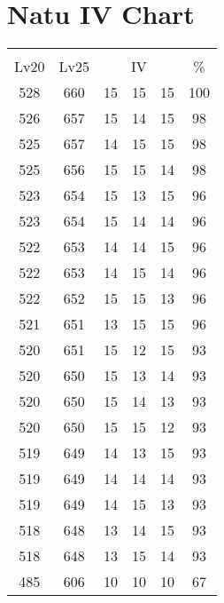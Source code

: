 \documentclass{article}%
\begin{document}
%
\normalsize%
\section{Natu IV Chart}%
\label{sec:Natu IV Chart}%
\renewcommand{\arraystretch}{1.5}%
\begin{tabular}{|c|c|c|c|c|c|}%
\hline%
\multicolumn{6}{|c|}{\textcolor{white}{ 
\linebreak{Natu}
}%
\cellcolor{black}}\\%
\multicolumn{1}{|c}{Lv20}&\multicolumn{1}{c|}{Lv25}&\multicolumn{3}{c|}{IV}&\multicolumn{1}{|c|}{\%}\\%
\hline%
\rowcolor{color100}%
528&660&15&15&15&100\\%
\hline%
\rowcolor{color98}%
526&657&15&14&15&98\\%
\hline%
\rowcolor{color98}%
525&657&14&15&15&98\\%
\hline%
\rowcolor{color98}%
525&656&15&15&14&98\\%
\hline%
\rowcolor{color96}%
523&654&15&13&15&96\\%
\hline%
\rowcolor{color96}%
523&654&15&14&14&96\\%
\hline%
\rowcolor{color96}%
522&653&14&14&15&96\\%
\hline%
\rowcolor{color96}%
522&653&14&15&14&96\\%
\hline%
\rowcolor{color96}%
522&652&15&15&13&96\\%
\hline%
\rowcolor{color96}%
521&651&13&15&15&96\\%
\hline%
\rowcolor{color93}%
520&651&15&12&15&93\\%
\hline%
\rowcolor{color93}%
520&650&15&13&14&93\\%
\hline%
\rowcolor{color93}%
520&650&15&14&13&93\\%
\hline%
\rowcolor{color93}%
520&650&15&15&12&93\\%
\hline%
\rowcolor{color93}%
519&649&14&13&15&93\\%
\hline%
\rowcolor{color93}%
519&649&14&14&14&93\\%
\hline%
\rowcolor{color93}%
519&649&14&15&13&93\\%
\hline%
\rowcolor{color93}%
518&648&13&14&15&93\\%
\hline%
\rowcolor{color93}%
518&648&13&15&14&93\\%
\hline%
\rowcolor{color91}%
485&606&10&10&10&67\\%
\end{tabular}

%
\end{document}
